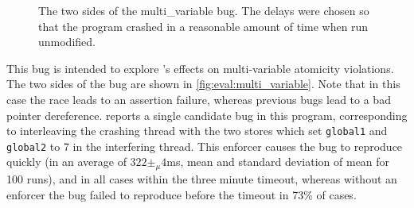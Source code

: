 \begin{figure}
  \hfill
  \caption{The two sides of the multi\_variable bug. The delays were
    chosen so that the program crashed in a reasonable amount of time
    when run unmodified.}
  \label{fig:eval:multi_variable}
\end{figure}

This bug is intended to explore {\technique}'s effects on
multi-variable atomicity violations.  The two sides of the bug are
shown in \autoref{fig:eval:multi_variable}.  Note that in this case
the race leads to an assertion failure, whereas previous bugs lead to
a bad pointer dereference.  {\Technique} reports a single candidate
bug in this program, corresponding to interleaving the crashing thread
with the two stores which set \texttt{global1} and \texttt{global2} to
7 in the interfering thread.  This enforcer causes the bug to
reproduce quickly (in an average of $322 \pm_\mu 4$ms, mean and standard
deviation of mean for 100 runs), and in all cases within the three
minute timeout, whereas without an enforcer the bug failed to
reproduce before the timeout in 73\% of cases.

